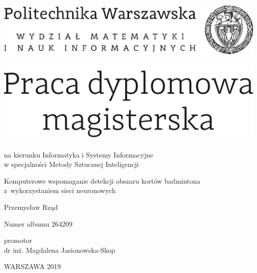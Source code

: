\documentclass[12pt,twoside,a4paper]{article}
\newcommand{\discipline}{Informatyka i Systemy Informacyjne}
\newcommand{\spec}{Metody Sztucznej Inteligencji} %
\renewcommand{\title}{Komputerowe wspomaganie detekcji obszaru kortów badmintona z~wykorzystaniem sieci neuronowych}
\renewcommand{\author}{Przemysław Rząd}
\newcommand{\album}{264209}
\newcommand{\supervisor}{dr inż. Magdalena Jasionowska-Skop}
\renewcommand{\year}{2019}
\begin{document}
\pagestyle{empty}

\begin{center}
\includegraphics[scale=1.]{img/politechnika} 
\vspace{70pt}


\includegraphics[scale=1.]{img/praca_mgr} %

{ \arial na kierunku \discipline
\\ w specjalności \spec %

\vspace{40pt}
{\arial \large \title}

\vspace{50pt}

{\arial \huge \author}

\vspace{5pt}

Numer albumu \album

\vspace{40pt}

promotor \\
{\arial \supervisor}

\vspace{15pt}
 

 \vfill
WARSZAWA \year \\
}
\end{center}
\end{document}
